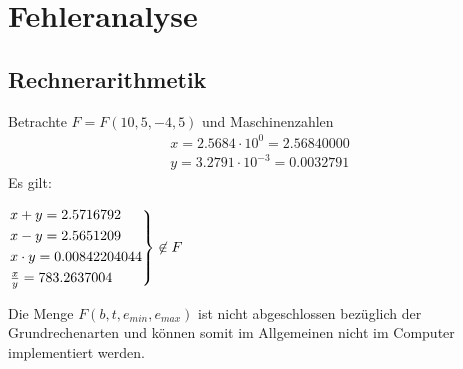 \section{Fehleranalyse}
\subsection{Rechnerarithmetik}
\begin{example}
Betrachte $F=F(10,5,-4,5)$ und Maschinenzahlen
\begin{align*}
x=2.5684 \cdot 10^{0}= 2.56840000 \\
y=3.2791 \cdot 10^{-3} = 0.0032791
\end{align*}
Es gilt:\\
\begin{center}
$\begin{rcases}
	x+y= 2.5716792 \\
	x-y= 2.5651209 \\
	x \cdot y= 0.00842204044 \\
	\frac{x}{y}= 783.2637004
\end{rcases} \not\in F$
\end{center}
\end{example}
\begin{remark}
Die Menge $F(b,t,e_{min},e_{max})$ ist nicht abgeschlossen bezüglich der Grundrechenarten und können somit im Allgemeinen nicht im Computer implementiert werden.
\end{remark}

